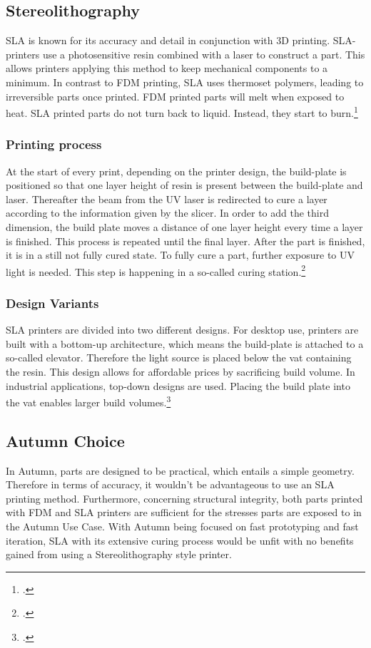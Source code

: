 \subsection{Stereolithography}

SLA is known for its accuracy and detail in conjunction with 3D printing. SLA-printers use a photosensitive resin combined with a laser to construct a part. This allows printers applying this method to keep mechanical components to a minimum. In contrast to FDM printing, SLA uses thermoset polymers, leading to irreversible parts once printed. FDM printed parts will melt when exposed to heat. SLA printed parts do not turn back to liquid. Instead, they start to burn.\footcite{hubsSLA3DPrintingNoDate}

\subsubsection{Printing process}

At the start of every print, depending on the printer design, the build-plate is positioned so that one layer height of resin is present between the build-plate and laser. Thereafter the beam from the UV laser is redirected to cure a layer according to the information given by the slicer. In order to add the third dimension, the build plate moves a distance of one layer height every time a layer is finished. This process is repeated until the final layer.\newline
After the part is finished, it is in a still not fully cured state. To fully cure a part, further exposure to UV light is needed. This step is happening in a so-called curing station.\footcite{hubsSLA3DPrintingNoDate} 

\subsubsection{Design Variants}

SLA printers are divided into two different designs. For desktop use, printers are built with a bottom-up architecture, which means the build-plate is attached to a so-called elevator. Therefore the light source is placed below the vat containing the resin. This design allows for affordable prices by sacrificing build volume.\newline
In industrial applications, top-down designs are used. Placing the build plate into the vat enables larger build volumes.\footcite{hubsSLA3DPrintingNoDate}

\subsection{Autumn Choice}

In Autumn, parts are designed to be practical, which entails a simple geometry. Therefore in terms of accuracy, it wouldn't be advantageous to use an SLA printing method. Furthermore, concerning structural integrity, both parts printed with FDM and SLA printers are sufficient for the stresses parts are exposed to in the Autumn Use Case. With Autumn being focused on fast prototyping and fast iteration, SLA with its extensive curing process would be unfit with no benefits gained from using a Stereolithography style printer. 
